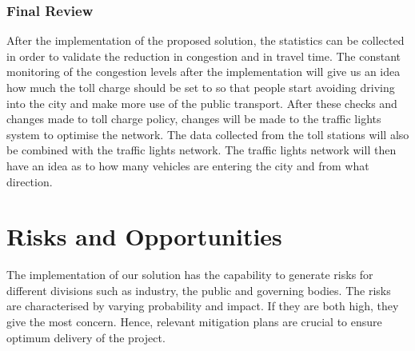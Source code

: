 \documentclass[twoside, a4paper, 11pt]{article}
\begin{document}
\subsubsection{Final Review}
After the implementation of the proposed solution, the statistics can be collected in order to validate the reduction in congestion and in travel time. The constant monitoring of the congestion levels after the implementation will give us an idea how much the toll charge should be set to so that people start avoiding driving into the city and make more use of the public transport. After these checks and changes made to toll charge policy, changes will be made to the traffic lights system to optimise the network. The data collected from the toll stations will also be combined with the traffic lights network. The traffic lights network will then have an idea as to how many vehicles are entering the city and from what direction. 
\newpage


\section{Risks and Opportunities}
The implementation of our solution has the capability to generate risks for different divisions such as industry, the public and governing bodies. The risks are characterised by varying probability and impact. If they are both high, they give the most concern. Hence, relevant mitigation plans are crucial to ensure optimum delivery of the project.
\end{document}
